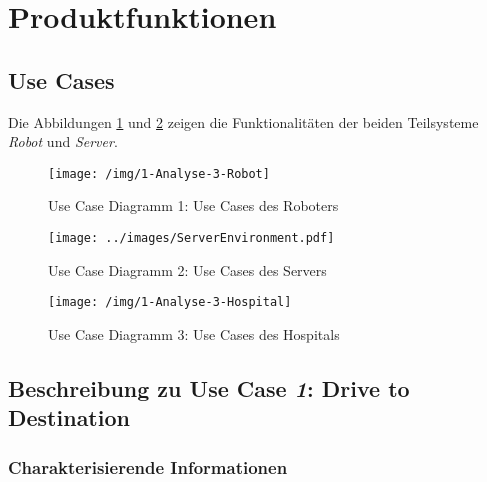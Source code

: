 \section{Produktfunktionen}

		\subsection{Use Cases}
		
		Die Abbildungen \ref{fig:3-1-robot-use-cases} und \ref{fig:3-1-server-use-cases} zeigen die Funktionalitäten der beiden Teilsysteme \emph{Robot} und \emph{Server}.
		
			\begin{figure}[H]
				\centering
				\texttt{[image: /img/1-Analyse-3-Robot]}
				\caption{Use Case Diagramm 1: Use Cases des Roboters}
				\label{fig:3-1-robot-use-cases}
			\end{figure}

			\begin{figure}[H]
				\centering
				\texttt{[image: ../images/ServerEnvironment.pdf]}
				\caption{Use Case Diagramm 2: Use Cases des Servers}
				\label{fig:3-1-server-use-cases}
			\end{figure}
			
			\begin{figure}[H]
				\centering
				\texttt{[image: /img/1-Analyse-3-Hospital]}
				\caption{Use Case Diagramm 3: Use Cases des Hospitals}
				\label{fig:3-1-hospital-use-cases}
			\end{figure}


		\pagebreak

		\subsection{Beschreibung zu Use Case \emph{1}: Drive to Destination}

			\subsubsection*{Charakterisierende Informationen}

